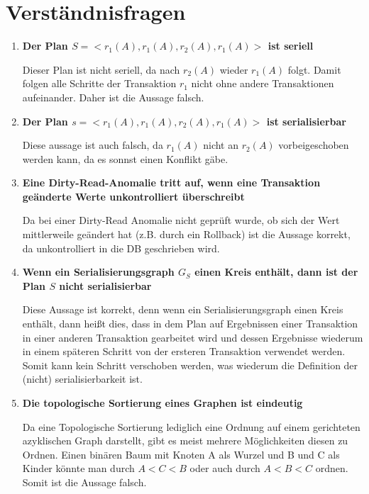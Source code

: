 \documentclass{scrartcl}
\begin{document}
\maketitle

\section{Verständnisfragen}
\begin{enumerate}
    \item \textbf{Der Plan $S=<r_1(A), r_1(A), r_2(A), r_1(A)>$ ist seriell}
    
    Dieser Plan ist nicht seriell, da nach $r_2(A)$ wieder $r_1(A)$ folgt. Damit folgen alle Schritte der Transaktion $r_1$ nicht ohne andere Transaktionen aufeinander. Daher ist die Aussage falsch.
    \item \textbf{Der Plan $s=<r_1(A), r_1(A), r_2(A), r_1(A)>$ ist serialisierbar}
    
    Diese aussage ist auch falsch, da $r_1(A)$ nicht an $r_2(A)$ vorbeigeschoben werden kann, da es sonnst einen Konflikt gäbe.
    \item \textbf{Eine Dirty-Read-Anomalie tritt auf, wenn eine Transaktion geänderte Werte unkontrolliert überschreibt}

    Da bei einer Dirty-Read Anomalie nicht geprüft wurde, ob sich der Wert mittlerweile geändert hat (z.B. durch ein Rollback) ist die Aussage korrekt, da unkontrolliert in die DB geschrieben wird.
    \item \textbf{Wenn ein Serialisierungsgraph $G_S$ einen Kreis enthält, dann ist der Plan $S$ nicht serialisierbar}
    
    Diese Aussage ist korrekt, denn wenn ein Serialisierungsgraph einen Kreis enthält, dann heißt dies, dass in dem Plan auf Ergebnissen einer Transaktion in einer anderen Transaktion gearbeitet wird und dessen Ergebnisse wiederum in einem späteren Schritt von der ersteren Transaktion verwendet werden. Somit kann kein Schritt verschoben werden, was wiederum die Definition der (nicht) serialisierbarkeit ist. 
    \item \textbf{Die topologische Sortierung eines Graphen ist eindeutig}
    
    Da eine Topologische Sortierung lediglich eine Ordnung auf einem gerichteten azyklischen Graph darstellt, gibt es meist mehrere Möglichkeiten diesen zu Ordnen. Einen binären Baum mit Knoten A als Wurzel und B und C als Kinder könnte man durch $A < C < B$ oder auch durch $A < B < C$ ordnen. Somit ist die Aussage falsch.
\end{enumerate} 
\end{document}
